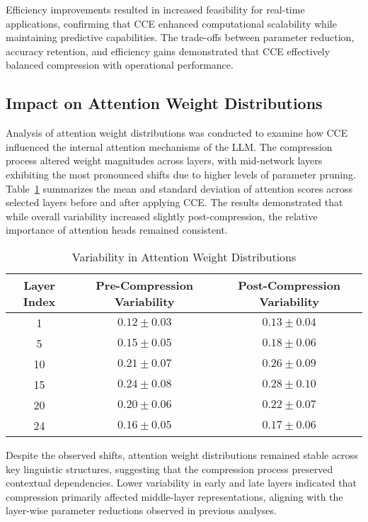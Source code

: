 \documentclass{article}
\begin{document}
Efficiency improvements resulted in increased feasibility for real-time applications, confirming that CCE enhanced computational scalability while maintaining predictive capabilities. The trade-offs between parameter reduction, accuracy retention, and efficiency gains demonstrated that CCE effectively balanced compression with operational performance.

\subsection{Impact on Attention Weight Distributions}

Analysis of attention weight distributions was conducted to examine how CCE influenced the internal attention mechanisms of the LLM. The compression process altered weight magnitudes across layers, with mid-network layers exhibiting the most pronounced shifts due to higher levels of parameter pruning. Table~\ref{tab:attention_variability} summarizes the mean and standard deviation of attention scores across selected layers before and after applying CCE. The results demonstrated that while overall variability increased slightly post-compression, the relative importance of attention heads remained consistent.

\begin{table}[t]
	\centering
	\caption{Variability in Attention Weight Distributions}
	\label{tab:attention_variability}
		\begin{tabular}{ccc}
			\hline
			\textbf{Layer Index} & \textbf{Pre-Compression Variability} & \textbf{Post-Compression Variability} \\
			\hline
			1  & $0.12 \pm 0.03$ & $0.13 \pm 0.04$ \\
			5  & $0.15 \pm 0.05$ & $0.18 \pm 0.06$ \\
			10 & $0.21 \pm 0.07$ & $0.26 \pm 0.09$ \\
			15 & $0.24 \pm 0.08$ & $0.28 \pm 0.10$ \\
			20 & $0.20 \pm 0.06$ & $0.22 \pm 0.07$ \\
			24 & $0.16 \pm 0.05$ & $0.17 \pm 0.06$ \\
			\hline
		\end{tabular}%
\end{table}

Despite the observed shifts, attention weight distributions remained stable across key linguistic structures, suggesting that the compression process preserved contextual dependencies. Lower variability in early and late layers indicated that compression primarily affected middle-layer representations, aligning with the layer-wise parameter reductions observed in previous analyses.
\end{document}
